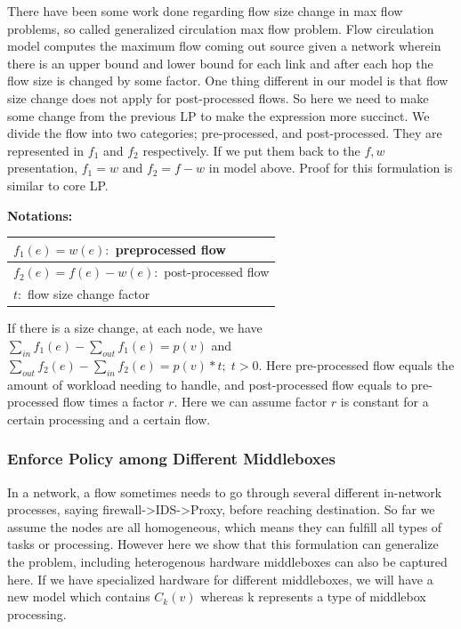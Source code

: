 \documentclass{sig-alternate}
\begin{document}
There have been some work done regarding flow size change in max flow problems, so called generalized circulation max flow problem.\cite{Wayne1999} Flow circulation model computes the maximum flow coming out source given a network wherein there is an upper bound and lower bound for each link and after each hop the flow size is changed by some factor.  One thing different in our model is that flow size change does not apply for post-processed flows. So here we need to make some change from the previous LP to make the expression more succinct. We divide the flow into two categories; pre-processed, and post-processed. They are represented in $f_1$ and $f_2$ respectively. If we put them back to the $f, w$ presentation, $f_1=w$ and $f_2= f-w$ in model above. Proof for this formulation is similar to core LP.

\textbf{Notations:}

\begin{tabular} {|l |}
\hline
$ f_1(e)=w(e): $ preprocessed flow \\ \hline
$ f_2(e) = f(e)-w(e):$ post-processed flow\\\hline
$t:$ flow size change factor \\ \hline
\end{tabular}
\newline

If there is a size change, at each node, we have $\sum\limits_{in} f_1(e) - \sum\limits_{out}  f_1(e) = p(v)$ and $\sum\limits_{out} f_2(e)-\sum\limits_{in}  f_2(e) = p(v)*t;\;t>0$. Here pre-processed flow equals the amount of workload needing to handle, and post-processed flow equals to pre-processed flow times a factor $r$. Here we can assume factor $r$ is constant for a certain processing and a certain flow. 


\subsubsection{Enforce Policy among Different Middleboxes}
In a network, a flow sometimes needs to go through several different in-network processes, saying firewall->IDS->Proxy, before reaching destination. So far we assume the nodes are all homogeneous, which means they can fulfill all types of tasks or processing. However here we show that this formulation can generalize the problem, including heterogenous hardware middleboxes can also be captured here. If we have specialized hardware for different middleboxes, we will have a new model which contains $C_k(v)$ whereas k represents a type of middlebox processing. 
\end{document}
